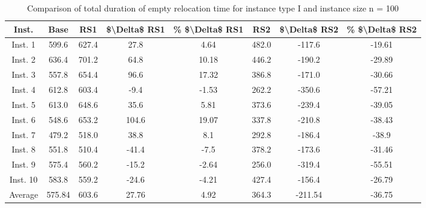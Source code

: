\begin{table}[H]
\centering
\begin{tabular}{cccccccc}
  \hline
  \textbf{Inst.} & \textbf{Base} & \textbf{RS1} & \textbf{\$\textbackslash{}Delta\$  RS1} & \textbf{\% \$\textbackslash{}Delta\$  RS1} & \textbf{RS2} & \textbf{\$\textbackslash{}Delta\$  RS2} & \textbf{\% \$\textbackslash{}Delta\$  RS2} \\\hline
  Inst. 1 & 599.6 & 627.4 & 27.8 & 4.64 & 482.0 & -117.6 & -19.61 \\
  Inst. 2 & 636.4 & 701.2 & 64.8 & 10.18 & 446.2 & -190.2 & -29.89 \\
  Inst. 3 & 557.8 & 654.4 & 96.6 & 17.32 & 386.8 & -171.0 & -30.66 \\
  Inst. 4 & 612.8 & 603.4 & -9.4 & -1.53 & 262.2 & -350.6 & -57.21 \\
  Inst. 5 & 613.0 & 648.6 & 35.6 & 5.81 & 373.6 & -239.4 & -39.05 \\
  Inst. 6 & 548.6 & 653.2 & 104.6 & 19.07 & 337.8 & -210.8 & -38.43 \\
  Inst. 7 & 479.2 & 518.0 & 38.8 & 8.1 & 292.8 & -186.4 & -38.9 \\
  Inst. 8 & 551.8 & 510.4 & -41.4 & -7.5 & 378.2 & -173.6 & -31.46 \\
  Inst. 9 & 575.4 & 560.2 & -15.2 & -2.64 & 256.0 & -319.4 & -55.51 \\
  Inst. 10 & 583.8 & 559.2 & -24.6 & -4.21 & 427.4 & -156.4 & -26.79 \\
  Average & 575.84 & 603.6 & 27.76 & 4.92 & 364.3 & -211.54 & -36.75 \\\hline
\end{tabular}
\caption{Comparison of total duration of empty relocation time for instance type I and instance size n = 100}
\label{tab:wait:resrelocation-empty-relocation-comparison_I_100}
\end{table}
